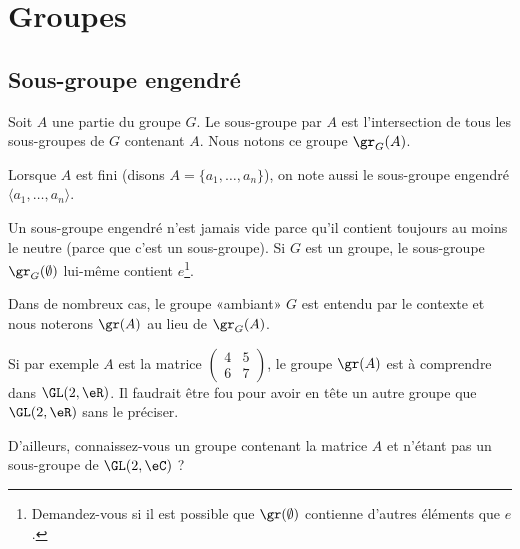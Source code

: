\section{Groupes}


\subsection{Sous-groupe engendré}


\begin{definition}          \label{DefooRDRXooEhVxxu}
	Soit \( A\) une partie du groupe \( G\). Le sous-groupe  par \( A\) est l'intersection de tous les sous-groupes de \( G\) contenant \( A\). Nous notons ce groupe \( \gr_G(A)\).

	Lorsque \( A \) est fini (disons \( A = \{a_1, \dots, a_n\} \)), on note aussi le sous-groupe engendré \( \langle a_1, \dots, a_n \rangle \).
\end{definition}

\begin{normaltext}
	Un sous-groupe engendré n'est jamais vide parce qu'il contient toujours au moins le neutre (parce que c'est un sous-groupe). Si \( G\) est un groupe, le sous-groupe \( \gr_G(\emptyset)\) lui-même contient \( e\)\footnote{Demandez-vous si il est possible que \( \gr(\emptyset)\) contienne d'autres éléments que \( e\).}.
\end{normaltext}

\begin{normaltext}
	Dans de nombreux cas, le groupe «ambiant» \( G\) est entendu par le contexte et nous noterons \( \gr(A)\) au lieu de \( \gr_G(A)\).

	Si par exemple \( A\) est la matrice \( \begin{pmatrix}
		4 & 5 \\
		6 & 7
	\end{pmatrix}\), le groupe \( \gr(A)\) est à comprendre dans \( \GL(2,\eR)\). Il faudrait être fou pour avoir en tête un autre groupe que \( \GL(2,\eR)\) sans le préciser.

	D'ailleurs, connaissez-vous un groupe contenant la matrice \( A\) et n'étant pas un sous-groupe de \( \GL(2,\eC)\) ?
\end{normaltext}

